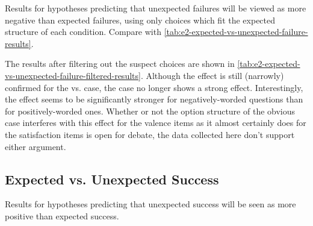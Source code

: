 \begin{table}[!b]
\centering
\bgroup
\def\arraystretch{1.3}
\setlength{\tabcolsep}{0.6em}

\egroup
\caption[Retrospective expected vs\@. unexpected failure results revisited]{Results for hypotheses predicting that unexpected failures will be viewed as more negative than expected failures, using only choices which fit the expected structure of each condition. Compare with \cref{tab:e2-expected-vs-unexpected-failure-results}.}
  \label{tab:e2-expected-vs-unexpected-failure-filtered-results}
\end{table}


The results after filtering out the suspect choices are shown in \cref{tab:e2-expected-vs-unexpected-failure-filtered-results}.
%
Although the effect is still (narrowly) confirmed for the \expf{} vs\@. \unxf{} case, the \obvfm{} case no longer shows a strong effect.
%
Interestingly, the effect seems to be significantly stronger for negatively-worded questions than for positively-worded ones.
%
Whether or not the option structure of the obvious case interferes with this effect for the valence items as it almost certainly does for the satisfaction items is open for debate, the data collected here don't support either argument.


\subsection{Expected vs\@. Unexpected Success}

\begin{table}[!b]
\centering
\bgroup
\def\arraystretch{1.3}
\setlength{\tabcolsep}{0.6em}

\egroup
\caption[Retrospective expected vs\@. unexpected success results]{Results for hypotheses predicting that unexpected success will be seen as more positive than expected success.}
  \label{tab:e2-expected-vs-unexpected-success-results}
\end{table}

